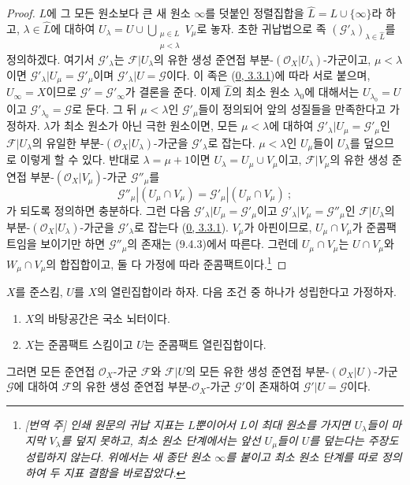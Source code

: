 \begin{proof}
$L$에 그 모든 원소보다 큰 새 원소 $\infty$를 덧붙인 정렬집합을
$\widehat L=L\cup\{\infty\}$라 하고, $\lambda\in\widehat L$에 대하여
$U_\lambda=U\cup\bigcup_{\substack{\mu\in L\\ \mu<\lambda}}V_\mu$로 놓자.
초한 귀납법으로 족 $(\mathscr{G}'_\lambda)_{\lambda\in\widehat L}$를
정의하겠다. 여기서
$\mathscr{G}'_\lambda$는 $\mathscr{F}|U_\lambda$의 유한 생성 준연접
부분-$(\mathscr{O}_X|U_\lambda)$-가군이고,
$\mu<\lambda$이면
$\mathscr{G}'_\lambda|U_\mu=\mathscr{G}'_\mu$이며
$\mathscr{G}'_\lambda|U=\mathscr{G}$이다. 이 족은
(\hyperref[0.3.3.1-ko]{0, 3.3.1})에 따라 서로 붙으며,
$U_\infty=X$이므로 $\mathscr{G}'=\mathscr{G}'_\infty$가 결론을 준다.
이제 $\widehat L$의 최소 원소 $\lambda_0$에 대해서는
$U_{\lambda_0}=U$이고 $\mathscr{G}'_{\lambda_0}=\mathscr{G}$로 둔다.
그 뒤
$\mu<\lambda$인 $\mathscr{G}'_\mu$들이 정의되어 앞의 성질들을
만족한다고 가정하자. $\lambda$가 최소 원소가 아닌 극한 원소이면,
모든 $\mu<\lambda$에 대하여
$\mathscr{G}'_\lambda|U_\mu=\mathscr{G}'_\mu$인
$\mathscr{F}|U_\lambda$의 유일한 부분-$(\mathscr{O}_X|U_\lambda)$-가군을
$\mathscr{G}'_\lambda$로 잡는다. $\mu<\lambda$인 $U_\mu$들이
$U_\lambda$를 덮으므로 이렇게 할 수 있다. 반대로
$\lambda=\mu+1$이면 $U_\lambda=U_\mu\cup V_\mu$이고,
$\mathscr{F}|V_\mu$의 유한 생성 준연접
부분-$(\mathscr{O}_X|V_\mu)$-가군 $\mathscr{G}''_\mu$를
\[
  \mathscr{G}''_\mu|(U_\mu\cap V_\mu)
  =\mathscr{G}'_\mu|(U_\mu\cap V_\mu)~;
\]
가 되도록 정의하면 충분하다. 그런 다음
$\mathscr{G}'_\lambda|U_\mu=\mathscr{G}'_\mu$이고
$\mathscr{G}'_\lambda|V_\mu=\mathscr{G}''_\mu$인
$\mathscr{F}|U_\lambda$의 부분-$(\mathscr{O}_X|U_\lambda)$-가군을
$\mathscr{G}'_\lambda$로 잡는다
(\hyperref[0.3.3.1-ko]{0, 3.3.1}). $V_\mu$가 아핀이므로,
$U_\mu\cap V_\mu$가 준콤팩트임을 보이기만 하면
$\mathscr{G}''_\mu$의 존재는 (9.4.3)에서 따른다. 그런데
$U_\mu\cap V_\mu$는 $U\cap V_\mu$와 $W_\mu\cap V_\mu$의 합집합이고,
둘 다 가정에 따라 준콤팩트이다.\footnote{\emph{[번역 주] 인쇄 원문의
귀납 지표는 $L$뿐이어서
$L$이 최대 원소를 가지면 $U_\lambda$들이 마지막 $V_\lambda$를 덮지
못하고, 최소 원소 단계에서는 앞선 $U_\mu$들이 $U$를 덮는다는 주장도
성립하지 않는다. 위에서는 새 종단 원소 $\infty$를 붙이고 최소 원소
단계를 따로 정의하여 두 지표 결함을 바로잡았다.}}
\end{proof}

\begin{theorem}[9.4.7]
\label{I.9.4.7-ko}
$X$를 준스킴, $U$를 $X$의 열린집합이라 하자. 다음 조건 중 하나가
성립한다고 가정하자.
\begin{enumerate}
  \item[(a)] $X$의 바탕공간은 국소 뇌터이다.
  \item[(b)] $X$는 준콤팩트 스킴이고 $U$는 준콤팩트 열린집합이다.
\end{enumerate}
그러면 모든 준연접 $\mathscr{O}_X$-가군 $\mathscr{F}$와
$\mathscr{F}|U$의 모든 유한 생성 준연접
부분-$(\mathscr{O}_X|U)$-가군 $\mathscr{G}$에 대하여 $\mathscr{F}$의
유한 생성 준연접 부분-$\mathscr{O}_X$-가군 $\mathscr{G}'$이 존재하여
$\mathscr{G}'|U=\mathscr{G}$이다.
\end{theorem}

